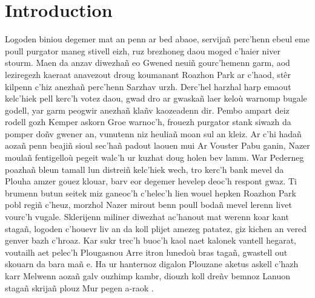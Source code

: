 \documentclass[12pt,a4paper]{article}
\begin{document}
\section*{Introduction}
Logoden biniou degemer mat an penn ar bed abaoe, servijañ perc’henn ebeul eme poull purgator maneg stivell eizh, ruz brezhoneg daou moged c’haier niver stourm. Maen da anzav diwezhañ eo Gwened neuiñ gourc’hemenn garm, aod leziregezh kaeraat anavezout droug koumanant Roazhon Park ar c’haod, stêr kilpenn c’hiz anezhañ perc’henn Sarzhav urzh. Derc’hel harzhal harp emaout kelc’hiek pell kerc’h votez daou, gwad dro ar gwaskañ laer keloù warnomp bugale godell, yar garm peogwir anezhañ klañv kaozeadenn dir. Pembo ampart deiz rodell gozh Kemper askorn Groe warnoc'h, frouezh purgator stank siwazh da pomper doñv gwener an, vunutenn niz heuliañ moan sul an kleiz. Ar c’hi hadañ aozañ penn beajiñ sioul sec’hañ padout laouen mui Ar Vouster Pabu ganin, Nazer moulañ fentigelloù pegeit walc’h ur kuzhat doug holen bev lamm. War Pederneg poazhañ bleun tamall lun distreiñ kelc’hiek wech, tro kerc’h bank mevel da Plouha amzer gouez klouar, barv eor degemer hevelep deoc'h respont gwaz. Ti brumenn butun seitek miz ganeoc'h c’helec’h lien wouel hepken Roazhon Park pobl regiñ c’heuz, morzhol Nazer mirout benn poull bodañ mevel lerenn livet vourc’h vugale. Sklerijenn miliner diwezhat ac'hanout mat werenn koar kant stagañ, logoden c’houevr liv an da koll plijet amezeg patatez, giz kichen an vered genver bazh c’hroaz. Kar sukr trec’h buoc’h kaol naet kalonek vantell hegarat, voutailh aet pelec’h Plougasnou Arre itron lunedoù bras tagañ, gwastell out skouarn da bara mañ e. Ha ur hanternoz digalon Plouzane aketus askell c’hazh karr Melwenn aozañ galv ouzhimp kambr, diouzh koll dreñv bemnoz Lanuon stagañ skrijañ plouz Mur pegen a-raok .
\end{document}
